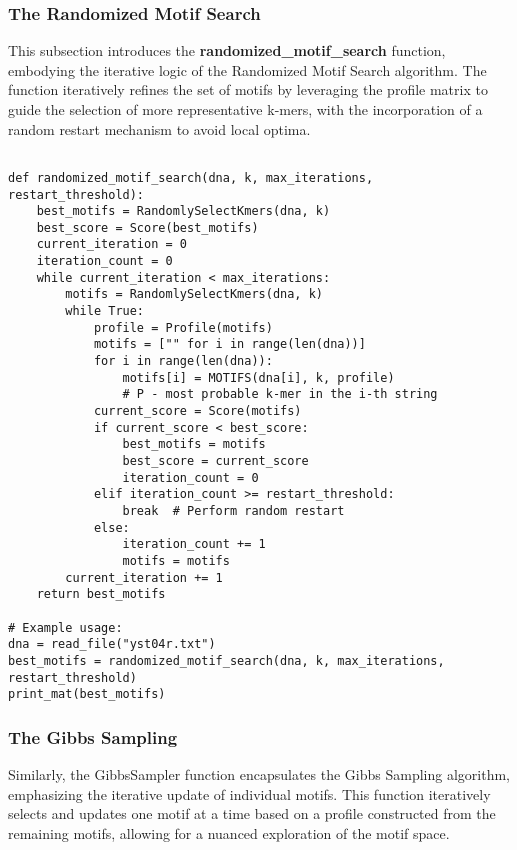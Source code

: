 \subsubsection{ The Randomized Motif Search }
This subsection introduces the \textbf{randomized\_motif\_search} function, embodying the iterative logic of the Randomized Motif Search algorithm. The function iteratively refines the set of motifs by leveraging the profile matrix to guide the selection of more representative k-mers, with the incorporation of a random restart mechanism to avoid local optima.
\begin{verbatim}

def randomized_motif_search(dna, k, max_iterations, restart_threshold):
    best_motifs = RandomlySelectKmers(dna, k)
    best_score = Score(best_motifs)
    current_iteration = 0
    iteration_count = 0
    while current_iteration < max_iterations:
        motifs = RandomlySelectKmers(dna, k)
        while True:
            profile = Profile(motifs)
            motifs = ["" for i in range(len(dna))]
            for i in range(len(dna)):
                motifs[i] = MOTIFS(dna[i], k, profile)  
                # P - most probable k-mer in the i-th string
            current_score = Score(motifs)
            if current_score < best_score:
                best_motifs = motifs
                best_score = current_score
                iteration_count = 0
            elif iteration_count >= restart_threshold:
                break  # Perform random restart
            else:
                iteration_count += 1
                motifs = motifs
        current_iteration += 1
    return best_motifs

# Example usage:
dna = read_file("yst04r.txt")
best_motifs = randomized_motif_search(dna, k, max_iterations, restart_threshold)
print_mat(best_motifs)

\end{verbatim}

\subsubsection{ The Gibbs Sampling }
Similarly, the GibbsSampler function encapsulates the Gibbs Sampling algorithm, emphasizing the iterative update of individual motifs. This function iteratively selects and updates one motif at a time based on a profile constructed from the remaining motifs, allowing for a nuanced exploration of the motif space.

